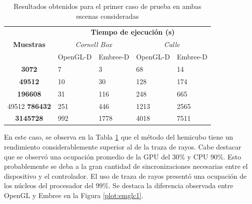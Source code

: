 \begin{table}[H]
	\centering
	\begin{tabular}{|c|l|l|l|l|}
		\hline
		\multirow{3}{*}{\textbf{Muestras}} & \multicolumn{4}{c|}{\textbf{Tiempo de ejecución (s)}}                                                                                  \\ \cline{2-5} 
		& \multicolumn{2}{c|}{\textit{Cornell Box}}                 & \multicolumn{2}{c|}{\textit{Calle}}                      \\ \cline{2-5} 
		& \multicolumn{1}{c|}{OpenGL-D} & \multicolumn{1}{c|}{Embree-D} & \multicolumn{1}{c|}{OpenGL-D} & \multicolumn{1}{c|}{Embree-D} \\ \hline
		\textbf{3072}                        & 7                           & 3                           & 68                          & 14                          \\ \hline
		\textbf{49512}                       & 10                          & 30                          & 128                         & 174                         \\ \hline
		\textbf{196608}                       & 31                          & 116                         & 248                         & 665                         \\ \hline
		
49512		\textbf{786432‬}                      & 251                         & 446                         & 1213                        & 2565                        \\ \hline
		\textbf{3145728}                      & 992                         & 1778                        & 4018                        & 7511                        \\ \hline
	\end{tabular}
	\caption{Resultados obtenidos para el primer caso de prueba en ambas escenas consideradas}
	\label{tab:tablecaso1}
\end{table}

En este caso, se observa en la Tabla \ref{tab:tablecaso1} que el método del hemicubo tiene un rendimiento considerablemente superior al de la traza de rayos. Cabe destacar que se observó una ocupación promedio de la GPU del 30\% y CPU 90\%. Esto probablemente se deba a la gran cantidad de sincronizaciones necesarias entre el dispositivo y el controlador. El uso de traza de rayos presentó una ocupación de los núcleos del procesador del 99\%. Se destaca la diferencia observada entre OpenGL y Embree en la Figura \ref{plot:emglc1}.


